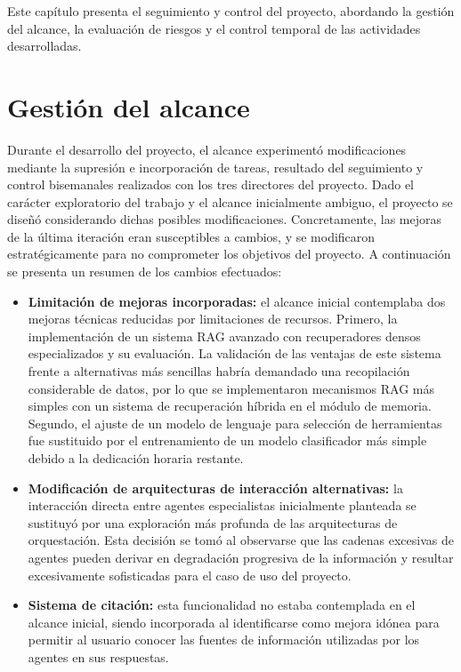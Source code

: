 Este capítulo presenta el seguimiento y control del proyecto, abordando la gestión del alcance, la evaluación de riesgos y el control temporal de las actividades desarrolladas.

\section{Gestión del alcance}
  Durante el desarrollo del proyecto, el alcance experimentó modificaciones mediante la supresión e incorporación de tareas, resultado del seguimiento y control bisemanales realizados con los tres directores del proyecto. Dado el carácter exploratorio del trabajo y el alcance inicialmente ambiguo, el proyecto se diseñó considerando dichas posibles modificaciones. Concretamente, las mejoras de la última iteración eran susceptibles a cambios, y se modificaron estratégicamente para no comprometer los objetivos del proyecto. A continuación se presenta un resumen de los cambios efectuados:

  \begin{itemize}
\item\textbf{Limitación de mejoras incorporadas: }el alcance inicial contemplaba dos mejoras técnicas reducidas por limitaciones de recursos. Primero, la implementación de un sistema RAG avanzado con recuperadores densos especializados y su evaluación. La validación de las ventajas de este sistema frente a alternativas más sencillas habría demandado una recopilación considerable de datos, por lo que se implementaron mecanismos RAG más simples con un sistema de recuperación híbrida en el módulo de memoria. Segundo, el ajuste de un modelo de lenguaje para selección de herramientas fue sustituido por el entrenamiento de un modelo clasificador más simple debido a la dedicación horaria restante.

\item\textbf{Modificación de arquitecturas de interacción alternativas: }la interacción directa entre agentes especialistas inicialmente planteada se sustituyó por una exploración más profunda de las arquitecturas de orquestación. Esta decisión se tomó al observarse que las cadenas excesivas de agentes pueden derivar en degradación progresiva de la información y resultar excesivamente sofisticadas para el caso de uso del proyecto.
     
  \item\textbf{Sistema de citación: }esta funcionalidad no estaba contemplada en el alcance inicial, siendo incorporada al identificarse como mejora idónea para permitir al usuario conocer las fuentes de información utilizadas por los agentes en sus respuestas.
  \end{itemize}

